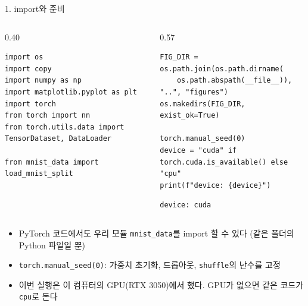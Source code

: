\documentclass[aspectratio=169,11pt]{beamer}
\newcommand{\code}[1]{\texttt{#1}}
\begin{document}
\begin{frame}[fragile]{1. import와 준비}
\begin{columns}[T,onlytextwidth]
\begin{column}{0.40\textwidth}
\begin{lstlisting}
import os
import copy
import numpy as np
import matplotlib.pyplot as plt
import torch
from torch import nn
from torch.utils.data import TensorDataset, DataLoader

from mnist_data import load_mnist_split
\end{lstlisting}
\end{column}
\begin{column}{0.57\textwidth}
\begin{lstlisting}
FIG_DIR = os.path.join(os.path.dirname(
    os.path.abspath(__file__)), "..", "figures")
os.makedirs(FIG_DIR, exist_ok=True)

torch.manual_seed(0)
device = "cuda" if torch.cuda.is_available() else "cpu"
print(f"device: {device}")
\end{lstlisting}
\begin{lstlisting}[style=outstyle]
device: cuda
\end{lstlisting}
\end{column}
\end{columns}
\small
\begin{itemize}
\item PyTorch 코드에서도 우리 모듈 \code{mnist\_data}를 import 할 수 있다 (같은 폴더의 Python 파일일 뿐)
\item \code{torch.manual\_seed(0)}: 가중치 초기화, 드롭아웃, \code{shuffle}의 난수를 고정
\item 이번 실행은 이 컴퓨터의 GPU(RTX 3050)에서 했다. GPU가 없으면 같은 코드가 \code{cpu}로 돈다
\end{itemize}
\end{frame}
\end{document}
